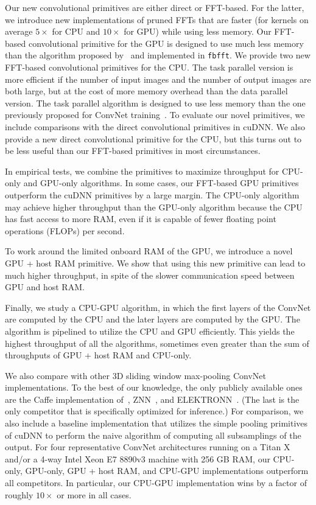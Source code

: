 \documentclass[conference]{./IEEEtran/IEEEtran}
\begin{document}
  Our new convolutional primitives are either direct or FFT-based.
  For the latter, we introduce new implementations of pruned FFTs that
  are faster (for kernels on average $5\times$ for CPU and $10\times$
  for GPU) while using less memory.  Our FFT-based convolutional
  primitive for the GPU is designed to use much less memory than the
  algorithm proposed by~\cite{mathieu-iclr-14,vasilache2014fast} and
  implemented in {\tt fbfft}.  We provide two new FFT-based
  convolutional primitives for the CPU. The task parallel version is
  more efficient if the number of input images and the number of
  output images are both large, but at the cost of more memory
  overhead than the data parallel version.  The task parallel
  algorithm is designed to use less memory than the one previously
  proposed for ConvNet training~\cite{zlateski2015znn}.  To evaluate
  our novel primitives, we include comparisons with the direct
  convolutional primitives in cuDNN.  We also provide a new direct
  convolutional primitive for the CPU, but this turns out to be less
  useful than our FFT-based primitives in most circumstances.

  In empirical tests, we combine the primitives to maximize throughput
  for CPU-only and GPU-only algorithms. In some cases, our FFT-based
  GPU primitives outperform the cuDNN primitives by a large margin.
  The CPU-only algorithm may achieve higher throughput than the
  GPU-only algorithm because the CPU has fast access to more RAM, even
  if it is capable of fewer floating point operations (FLOPs) per
  second.

  To work around the limited onboard RAM of the GPU, we introduce a
  novel GPU + host RAM primitive.  We show that using this new
  primitive can lead to much higher throughput, in spite of the slower
  communication speed between GPU and host RAM.

  Finally, we study a CPU-GPU algorithm, in which the first layers of
  the ConvNet are computed by the CPU and the later layers are
  computed by the GPU.  The algorithm is pipelined to utilize the CPU
  and GPU efficiently.  This yields the highest throughput of all the
  algorithms, sometimes even greater than the sum of throughputs of
  GPU + host RAM and CPU-only.

  We also compare with other 3D sliding window max-pooling ConvNet
  implementations.  To the best of our knowledge, the only publicly
  available ones are the Caffe implementation
  of~\cite{tschopp2015efficient}, ZNN~\cite{zlateski2015znn}, and
  ELEKTRONN~\cite{ELEKTRONN2015}.  (The last is the only competitor
  that is specifically optimized for inference.) For comparison, we
  also include a baseline implementation that utilizes the simple
  pooling primitives of cuDNN to perform the naive algorithm of
  computing all subsamplings of the output.  For four representative
  ConvNet architectures running on a Titan X and/or a 4-way Intel Xeon
  E7 8890v3 machine with 256 GB RAM, our CPU-only, GPU-only, GPU +
  host RAM, and CPU-GPU implementations outperform all competitors.
  In particular, our CPU-GPU implementation wins by a factor of
  roughly $10\times$ or more in all cases.
\end{document}
